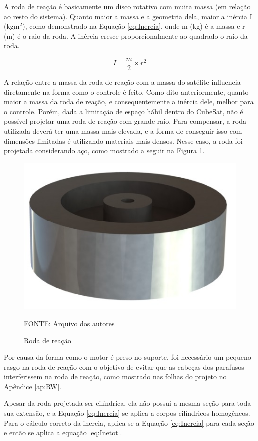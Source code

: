 \documentclass[
	12pt,				%
	openany,			%
	twoside,			%
	a4paper,			%
	english,			%
	french,				%
	spanish,			%
	brazil,				%
	oldfontcommands
	]{abntex2}
\begin{document}
A roda de reação é basicamente um disco rotativo com muita massa (em relação ao resto do sistema). Quanto maior a massa e a geometria dela, maior a inércia I (kgm$^2$), como demonstrado na Equação \ref{eq:Inercia}, onde m (kg) é a massa e r (m) é o raio da roda. A inércia cresce proporcionalmente ao quadrado o raio da roda.

\begin{equation}
I = \frac{m}{2} \times r^2
\label{eq:Inercia}
\end{equation}

A relação entre a massa da roda de reação com a massa do satélite influencia diretamente na forma como o controle é feito. Como dito anteriormente, quanto maior a massa da roda de reação, e consequentemente a inércia dele, melhor para o controle. Porém, dada a limitação de espaço hábil dentro do CubeSat, não é possível projetar uma roda de reação com grande raio. Para compensar, a roda utilizada deverá ter uma massa mais elevada, e a forma de conseguir isso com dimensões limitadas é utilizando materiais mais densos. Nesse caso, a roda foi projetada considerando aço, como mostrado a seguir na Figura \ref{fig:RW}.

\begin{figure}[th]
	\caption{Roda de reação}
	\centering
	\includegraphics[width=0.5\linewidth]{./figs/Reaction_Wheel}
	
	\begin{small}
		FONTE: Arquivo dos autores
	\end{small}
	\label{fig:RW}
\end{figure}

Por causa da forma como o motor é preso no suporte, foi necessário um pequeno rasgo na roda de reação com o objetivo de evitar que as cabeças dos parafusos interferissem na roda de reação, como mostrado nas folhas do projeto no Apêndice \ref{ap:RW}.

Apesar da roda projetada ser cilíndrica, ela não possui a mesma seção para toda sua extensão, e a Equação \ref{eq:Inercia} se aplica a corpos cilíndricos homogêneos. Para o cálculo correto da inercia, aplica-se a Equação \ref{eq:Inercia} para cada seção e então se aplica a equação \ref{eq:Inetot}.
\end{document}
